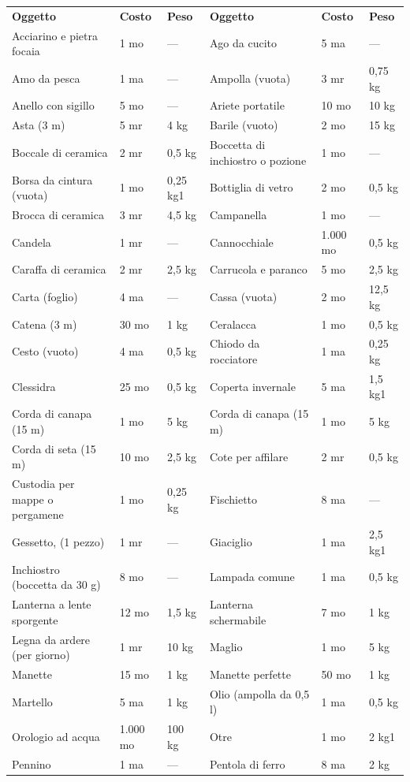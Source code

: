 \documentclass[a4paper,11pt,twoside,openany]{dndbook}
\begin{document}
{\begin{longtable}{|L{4cm} |k{1.5cm} |k{1.5cm}|L{5cm} |k{1.5cm} |k{1.5cm}|}
	\textbf{Oggetto}&	\textbf{Costo}	& \textbf{Peso}&\textbf{Oggetto}&	\textbf{Costo}	&\textbf{Peso}\\
Acciarino e pietra focaia	&1 mo&	— & 	Ago da cucito&	5 ma&	—\\
Amo da pesca&	1 ma&	—&	Ampolla (vuota)&	3 mr&	0,75 kg\\
Anello con sigillo&	5 mo&	—&	Ariete portatile&	10 mo	&10 kg\\
Asta (3 m)&	5 mr&	4 kg&	Barile (vuoto)&	2 mo&	15 kg\\
Boccale di ceramica	&2 mr&	0,5 kg&	Boccetta di inchiostro o pozione&	1 mo&	—\\
Borsa da cintura (vuota)&	1 mo&	0,25 kg1&	Bottiglia di vetro&	2 mo&	0,5 kg\\
Brocca di ceramica&	3 mr&	4,5 kg&	Campanella&	1 mo&	—\\
Candela&	1 mr&	—&	Cannocchiale&	1.000 mo&	0,5 kg\\
Caraffa di ceramica&	2 mr&	2,5 kg&	Carrucola e paranco&	5 mo&	2,5 kg\\
Carta (foglio)&	4 ma&	—&	Cassa (vuota)&	2 mo&	12,5 kg\\
Catena (3 m)&	30 mo&	1 kg&	Ceralacca&	1 mo&	0,5 kg\\
Cesto (vuoto)&	4 ma&	0,5 kg&	Chiodo da rocciatore&	1 ma&	0,25 kg\\
Clessidra&	25 mo	&0,5 kg&	Coperta invernale&	5 ma&	1,5 kg1\\
Corda di canapa (15 m)	&1 mo&	5 kg&	Corda di canapa (15 m)&1 mo&5 kg\\
Corda di seta (15 m)&10 mo&2,5 kg&	Cote per affilare&2 mr&0,5 kg\\
Custodia per mappe o pergamene&1 mo&0,25 kg&	Fischietto&8 ma&—\\
Gessetto, (1 pezzo)&1 mr&—&	Giaciglio&1 ma&2,5 kg1\\
Inchiostro (boccetta da 30 g)&8 mo&—&	Lampada comune&1 ma&0,5 kg\\
Lanterna a lente sporgente&12 mo&1,5 kg&	Lanterna schermabile&7 mo&1 kg\\
Legna da ardere (per giorno)&1 mr&10 kg&	Maglio&1 mo&5 kg\\
Manette&15 mo&1 kg&	Manette perfette&50 mo&1 kg\\
Martello&5 ma&1 kg&	Olio (ampolla da 0,5 l)&1 ma&0,5 kg\\
Orologio ad acqua&1.000 mo&100 kg&	Otre&1 mo&2 kg1\\
Pennino&1 ma&—&	Pentola di ferro&8 ma&2 kg\\

\end{longtable}}
\end{document}
